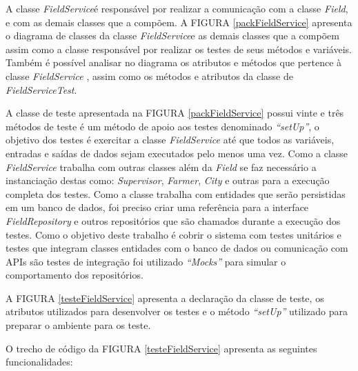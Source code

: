 A classe \textit{FieldService}é responsável por realizar a comunicação com a classe \textit{Field}, e com as demais classes que a compõem. A FIGURA \ref{packFieldService} apresenta o diagrama de classes da classe \textit{FieldService}e as demais classes que a compõem assim como a classe responsável por realizar os testes de seus métodos e variáveis. Também é possível analisar no diagrama os atributos e métodos que pertence à classe \textit{ FieldService }, assim como os métodos e atributos da classe de \textit{ FieldServiceTest}.  


A classe de teste apresentada na FIGURA \ref{packFieldService} possui vinte e três métodos de teste é um método de apoio aos testes denominado \textit{“setUp”}, o objetivo dos testes é exercitar a classe \textit{FieldService} até que todos as variáveis, entradas e saídas de dados sejam executados pelo menos uma vez. Como a classe \textit{FieldService} trabalha com outras classes além da \textit{Field} se faz necessário a instanciação destas como: \textit{Supervisor}, \textit{Farmer}, \textit{City} e outras para a execução completa dos testes. Como a classe trabalha com entidades que serão persistidas em um banco de dados, foi preciso criar uma referência para a interface \textit{FieldRepository} e outros repositórios que são chamados durante a execução dos testes. Como o objetivo deste trabalho é cobrir o sistema com testes unitários e testes que integram classes entidades com o banco de dados ou comunicação com APIs são testes de integração foi utilizado\textit{ “Mocks”} para simular o comportamento dos repositórios.



A FIGURA \ref{testeFieldService} apresenta a declaração da classe de teste, os atributos utilizados para desenvolver os testes e o método\textit{ “setUp”} utilizado para preparar o ambiente para os teste.

O trecho de código da FIGURA \ref{testeFieldService} apresenta as seguintes funcionalidades:

